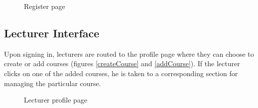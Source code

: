 \documentclass[a4paper,12pt]{article}
\numberwithin{equation}{section} %
\numberwithin{figure}{section}
\begin{document}
\begin{figure}[H]
	\caption{Register page}
	\label{register}
\endminipage
\end{figure}



\subsection{Lecturer Interface}
Upon signing in, lecturers are routed to the profile page where they can choose to create or add courses (figures \ref{createCourse} and \ref{addCourse}). If the lecturer clicks on one of the added courses, he is taken to a corresponding section for managing the particular course.

\begin{figure}[H]
\centering
{}
\caption{Lecturer profile page}
\label{lecturerProfile}
\end{figure}
\end{document}
